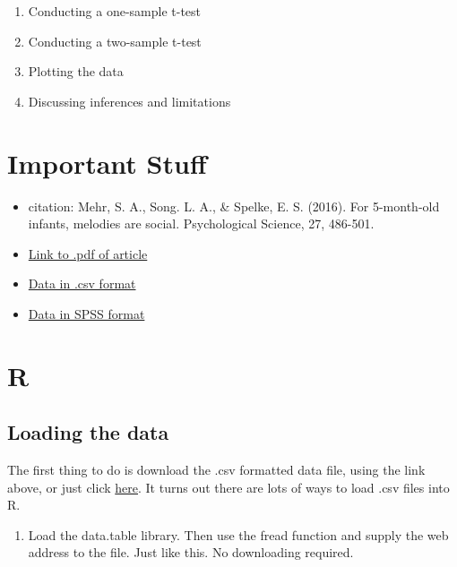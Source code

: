 \documentclass[]{book}
\providecommand{\tightlist}{%
  \setlength{\itemsep}{0pt}\setlength{\parskip}{0pt}}
\theoremstyle{definition}
\theoremstyle{definition}
\theoremstyle{definition}
\theoremstyle{remark}
\begin{document}
\begin{enumerate}
\def\labelenumi{\arabic{enumi}.}
\tightlist
\item
  Conducting a one-sample t-test
\item
  Conducting a two-sample t-test
\item
  Plotting the data
\item
  Discussing inferences and limitations
\end{enumerate}

\section{Important Stuff}\label{important-stuff}

\begin{itemize}
\tightlist
\item
  citation: Mehr, S. A., Song. L. A., \& Spelke, E. S. (2016). For
  5-month-old infants, melodies are social. Psychological Science, 27,
  486-501.
\item
  \href{http://journals.sagepub.com/stoken/default+domain/d5HcBHg85XamSXGdYqYN/full}{Link
  to .pdf of article}
\item
  \href{https://drive.google.com/open?id=0Bz-rhZ21ShvOdW1wV0pmUTJSSk0}{Data
  in .csv format}
\item
  \href{https://drive.google.com/open?id=0Bz-rhZ21ShvOa3c4X3hqOWxwcUU}{Data
  in SPSS format}
\end{itemize}

\section{R}\label{r-6}

\subsection{Loading the data}\label{loading-the-data}

The first thing to do is download the .csv formatted data file, using
the link above, or just click
\href{https://drive.google.com/open?id=0Bz-rhZ21ShvOdW1wV0pmUTJSSk0}{here}.
It turns out there are lots of ways to load .csv files into R.

\begin{enumerate}
\def\labelenumi{\arabic{enumi}.}
\tightlist
\item
  Load the data.table library. Then use the fread function and supply
  the web address to the file. Just like this. No downloading required.
\end{enumerate}
\end{document}
